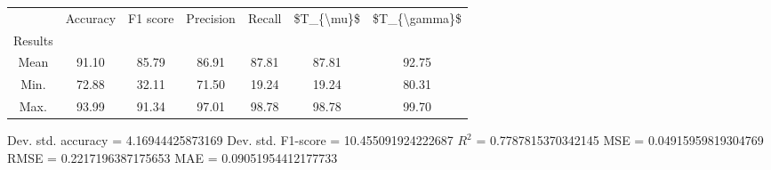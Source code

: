 \begin{tabular}{|c|c|c|c|c|c|c|}
\toprule
{} &  Accuracy &  F1 score &  Precision &  Recall &  \$T\_\{\textbackslash mu\}\$ &  \$T\_\{\textbackslash gamma\}\$ \\
Results &           &           &            &         &            &               \\
\hline
Mean    &     91.10 &     85.79 &      86.91 &   87.81 &      87.81 &         92.75 \\
Min.    &     72.88 &     32.11 &      71.50 &   19.24 &      19.24 &         80.31 \\
Max.    &     93.99 &     91.34 &      97.01 &   98.78 &      98.78 &         99.70 \\
\bottomrule
\end{tabular}

 Dev. std. accuracy = 4.16944425873169
 Dev. std. F1-score = 10.455091924222687
 $R^2$ = 0.7787815370342145
 MSE = 0.04915959819304769
 RMSE = 0.2217196387175653
 MAE = 0.09051954412177733